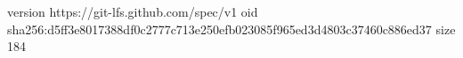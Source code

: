 version https://git-lfs.github.com/spec/v1
oid sha256:d5ff3e8017388df0c2777c713e250efb023085f965ed3d4803c37460c886ed37
size 184
